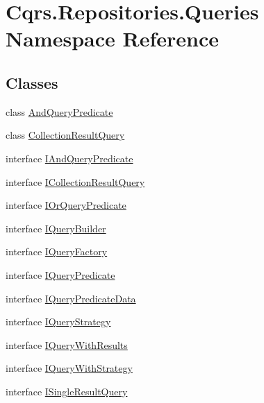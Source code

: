 \hypertarget{namespaceCqrs_1_1Repositories_1_1Queries}{}\section{Cqrs.\+Repositories.\+Queries Namespace Reference}
\label{namespaceCqrs_1_1Repositories_1_1Queries}
\subsection*{Classes}
\begin{DoxyCompactItemize}
\item 
class \hyperlink{classCqrs_1_1Repositories_1_1Queries_1_1AndQueryPredicate}{And\+Query\+Predicate}
\item 
class \hyperlink{classCqrs_1_1Repositories_1_1Queries_1_1CollectionResultQuery}{Collection\+Result\+Query}
\item 
interface \hyperlink{interfaceCqrs_1_1Repositories_1_1Queries_1_1IAndQueryPredicate}{I\+And\+Query\+Predicate}
\item 
interface \hyperlink{interfaceCqrs_1_1Repositories_1_1Queries_1_1ICollectionResultQuery}{I\+Collection\+Result\+Query}
\item 
interface \hyperlink{interfaceCqrs_1_1Repositories_1_1Queries_1_1IOrQueryPredicate}{I\+Or\+Query\+Predicate}
\item 
interface \hyperlink{interfaceCqrs_1_1Repositories_1_1Queries_1_1IQueryBuilder}{I\+Query\+Builder}
\item 
interface \hyperlink{interfaceCqrs_1_1Repositories_1_1Queries_1_1IQueryFactory}{I\+Query\+Factory}
\item 
interface \hyperlink{interfaceCqrs_1_1Repositories_1_1Queries_1_1IQueryPredicate}{I\+Query\+Predicate}
\item 
interface \hyperlink{interfaceCqrs_1_1Repositories_1_1Queries_1_1IQueryPredicateData}{I\+Query\+Predicate\+Data}
\item 
interface \hyperlink{interfaceCqrs_1_1Repositories_1_1Queries_1_1IQueryStrategy}{I\+Query\+Strategy}
\item 
interface \hyperlink{interfaceCqrs_1_1Repositories_1_1Queries_1_1IQueryWithResults}{I\+Query\+With\+Results}
\item 
interface \hyperlink{interfaceCqrs_1_1Repositories_1_1Queries_1_1IQueryWithStrategy}{I\+Query\+With\+Strategy}
\item 
interface \hyperlink{interfaceCqrs_1_1Repositories_1_1Queries_1_1ISingleResultQuery}{I\+Single\+Result\+Query}

\end{DoxyCompactItemize}
